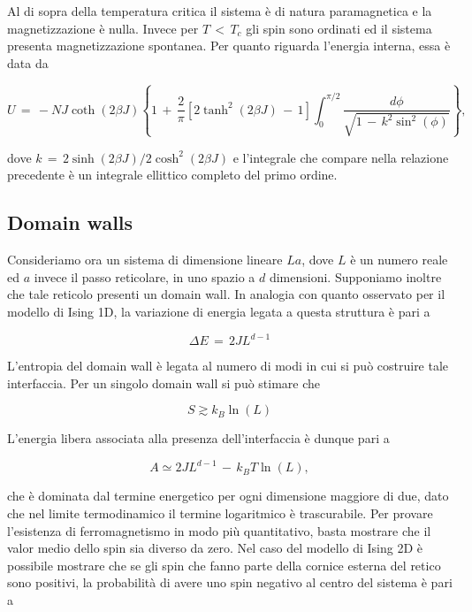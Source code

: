 Al di sopra della temperatura critica il sistema è di natura paramagnetica e la magnetizzazione è nulla. Invece per $T\,<\,T_c$ gli 
spin sono ordinati ed il sistema presenta magnetizzazione spontanea. Per quanto riguarda l'energia interna, essa 
è data da \cite{Patria}

\begin{equation}
    U\,=\,-NJ\coth{\left(2\beta J\right)}\left\{1\,+\,\frac{2}{\pi}\left[2\tanh^2\left(2\beta J\right)\,-\,1\right]\int_0^{\pi/2}\frac{d\phi}{\sqrt{1\,-\,k^2\sin^2{\left(\phi\right)}}}\right\},
    \label{eq: ene_Onsager_1944}
\end{equation}

dove $k\,=\,2\sinh{\left(2\beta J\right)}/2\cosh^2{\left(2\beta J\right)}$ e l'integrale che compare nella relazione 
precedente è un integrale ellittico completo del primo ordine.



\subsection{Domain walls}

Consideriamo ora un sistema di dimensione lineare $La$, dove $L$ è un numero reale ed $a$ invece il passo reticolare, in uno spazio a $d$ dimensioni. 
Supponiamo inoltre che tale reticolo presenti un domain wall. In analogia con quanto osservato per il modello di Ising 1D, la 
variazione di energia legata a questa struttura è pari a 

\begin{equation}
    \Delta E\,=\,2JL^{d-1}
    \label{eq: ene_dw_IsingdD}
\end{equation}

L'entropia del domain wall è legata al numero di modi in cui si può costruire tale interfaccia. Per un singolo domain wall si può 
stimare che 

\begin{equation}
    S \gtrsim k_B \ln{\left(L\right)}
    \label{eq: entr_dw_IsingdD}
\end{equation}

L'energia libera associata alla presenza dell'interfaccia è dunque pari a 

\begin{equation}
    A \simeq 2JL^{d-1}\,-\,k_B T\ln{\left(L\right)},
    \label{eq: freeE_dw_IsingdD}
\end{equation}

che è dominata dal termine energetico per ogni dimensione maggiore di due, dato che nel limite termodinamico il termine 
logaritmico è trascurabile. Per provare l'esistenza di ferromagnetismo in modo più quantitativo, basta mostrare che il valor medio 
dello spin sia diverso da zero. Nel caso del modello di Ising 2D è possibile mostrare che se gli spin che fanno parte della cornice 
esterna del retico sono positivi, la probabilità di avere uno spin negativo al centro del sistema è pari a 

